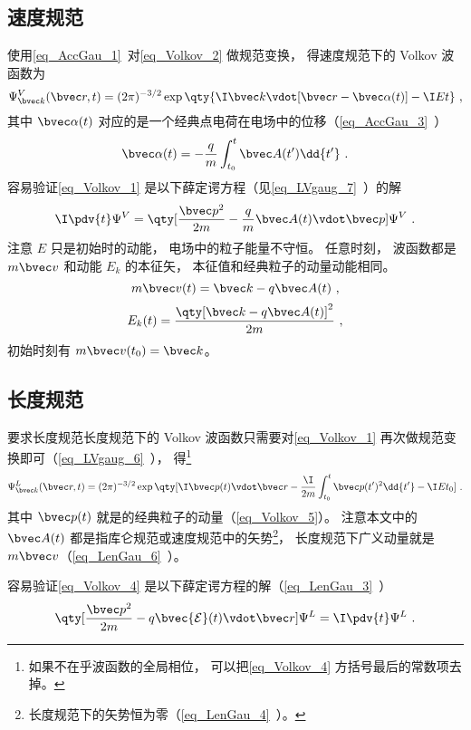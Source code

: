 \subsection{速度规范}
使用\autoref{eq_AccGau_1}~对\autoref{eq_Volkov_2} 做规范变换， 得速度规范下的 Volkov 波函数为
\begin{equation}\label{eq_Volkov_1}
\Psi_{\bvec k}^V(\bvec r, t) = (2\pi)^{-3/2} \exp\qty{\I \bvec k \vdot [\bvec r - \bvec \alpha(t)] - \I E t}~,
\end{equation}
其中 $\bvec \alpha(t)$ 对应的是一个经典点电荷在电场中的位移（\autoref{eq_AccGau_3}~）
\begin{equation}
\bvec \alpha(t) = -\frac{q}{m} \int_{t_0}^t \bvec A(t') \dd{t'}~.
\end{equation}
容易验证\autoref{eq_Volkov_1} 是以下薛定谔方程（见\autoref{eq_LVgaug_7}~）的解
\begin{equation}
\I \pdv{t} \Psi^V = \qty[\frac{\bvec p^2}{2m} - \frac{q}{m}\bvec A(t) \vdot \bvec p] \Psi^V~.
\end{equation}
注意 $E$ 只是初始时的动能， 电场中的粒子能量不守恒。 任意时刻， 波函数都是 $m\bvec v$ 和动能 $E_k$ 的本征矢， 本征值和经典粒子的动量动能相同。
\begin{equation}\label{eq_Volkov_5}
m\bvec v(t) = \bvec k - q\bvec A(t)~,
\end{equation}
\begin{equation}
E_k(t) = \frac{\qty[\bvec k - q\bvec A(t)]^2}{2m}~,
\end{equation}
初始时刻有 $ m\bvec v(t_0) = \bvec k$。

\subsection{长度规范}
要求长度规范长度规范下的 Volkov 波函数只需要对\autoref{eq_Volkov_1} 再次做规范变换即可（\autoref{eq_LVgaug_6}~）， 得\footnote{如果不在乎波函数的全局相位， 可以把\autoref{eq_Volkov_4} 方括号最后的常数项去掉。}
\begin{equation}\label{eq_Volkov_4}
\Psi_{\bvec k}^L(\bvec r, t) = (2\pi)^{-3/2} \exp\qty[\I \bvec p(t)\vdot \bvec r - \frac{\I}{2m}\int_{t_0}^t \bvec p(t')^2 \dd{t'} - \I E t_0]~.
\end{equation}
其中 $\bvec p(t)$ 就是的经典粒子的动量（\autoref{eq_Volkov_5}）。 注意本文中的 $\bvec A(t)$ 都是指库仑规范或速度规范中的矢势\footnote{长度规范下的矢势恒为零（\autoref{eq_LenGau_4}~）。}， 长度规范下广义动量就是 $m\bvec v$（\autoref{eq_LenGau_6}~）。

容易验证\autoref{eq_Volkov_4} 是以下薛定谔方程的解（\autoref{eq_LenGau_3}~）
\begin{equation}
\qty[\frac{\bvec p^2}{2m} - q \bvec {\mathcal E}(t) \vdot \bvec r] \Psi^L = \I \pdv{t} \Psi^L~.
\end{equation}
